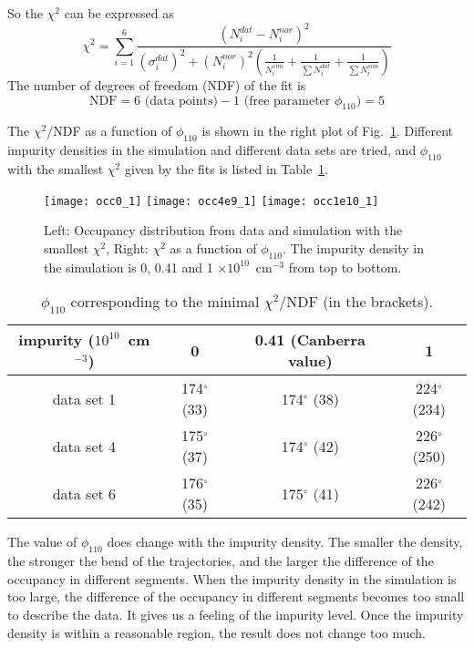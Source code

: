 \documentclass[12pt, a4paper]{article}
\begin{document}
So the $\chi^{2}$ can be expressed as
\begin{equation}
  \label{e:fx2}
  \chi^{2} = \sum_{i=1}^{6} \frac{(N_{i}^{dat} - N_{i}^{nor})^{2}} 
  {(\sigma_{i}^{dat})^{2} + (N_{i}^{nor})^{2}(\frac{1}{N_{i}^{sim}} + 
    \frac{1}{\sum N_{i}^{dat}} + \frac{1}{\sum N_{i}^{sim}})}
\end{equation}
The number of degrees of freedom (NDF) of the fit is
\begin{equation}
  \label{e:ndf}
  \text{NDF} = 6 \text{ (data points)} - 1 \text{ (free parameter } \phi_{110}) = 5
\end{equation}

The $\chi^{2}$/NDF as a function of $\phi_{110}$ is shown in the right
plot of Fig.~\ref{f:occ4e9}. Different impurity densities in the
simulation and different data sets are tried, and $\phi_{110}$ with
the smallest $\chi^{2}$ given by the fits is listed in
Table~\ref{t:res}. 

\begin{figure}[pbht]
  \centering
  \texttt{[image: occ0\_1]}
  \texttt{[image: occ4e9\_1]}
  \texttt{[image: occ1e10\_1]}
  \caption{Left: Occupancy distribution from data and simulation with
    the smallest $\chi^2$, Right: $\chi^2$ as a function of
    $\phi_{110}$. The impurity density in the simulation is 0, 0.41
    and 1 $\times 10^{10}$~cm$^{-3}$ from top to bottom.}
  \label{f:occ4e9}
\end{figure}

\begin{table}[pbht]
  \centering
  \caption{$\phi_{110}$ corresponding to the minimal $\chi^{2}$/NDF 
    (in the brackets).}
  \label{t:res}
\begin{tabular}{c|c|c|c}
\hline
impurity ($10^{10}$~cm$^{-3}$) & 0 & 0.41 (Canberra value)& 1 \\\hline
data set 1 & 174$^\circ$ (33) & 174$^\circ$ (38) & 224$^\circ$ (234) \\
data set 4 & 175$^\circ$ (37) & 174$^\circ$ (42) & 226$^\circ$ (250) \\
data set 6 & 176$^\circ$ (35) & 175$^\circ$ (41) & 226$^\circ$ (242) \\\hline
\end{tabular}
\end{table}

The value of $\phi_{110}$ does change with the impurity density. The
smaller the density, the stronger the bend of the trajectories, and
the larger the difference of the occupancy in different segments. When
the impurity density in the simulation is too large, the difference of
the occupancy in different segments becomes too small to describe the
data. It gives us a feeling of the impurity level. Once the impurity
density is within a reasonable region, the result does not change too
much.
\end{document}
